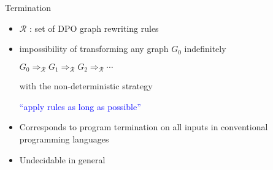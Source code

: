 \documentclass{beamer}
\begin{document}
\begin{frame}{Termination}
  \begin{itemize}
    \item $\mathcal{R}$ : set of DPO graph rewriting rules
    \item impossibility of transforming any graph $G_0$ indefinitely
      \begin{center}
        $G_0 \Rightarrow_\mathcal{R} G_1 \Rightarrow_\mathcal{R} G_2 \Rightarrow_\mathcal{R} \cdots$
      \end{center}
      with the non-deterministic strategy
          \begin{center}
              \textcolor{blue}{\enquote{apply rules as long as possible}}
          \end{center}
    \item Corresponds to program termination on all inputs in conventional programming languages
          
    \item Undecidable in general~\cite{plump1998terminationundecidable}
  \end{itemize}
\end{frame}
\end{document}
